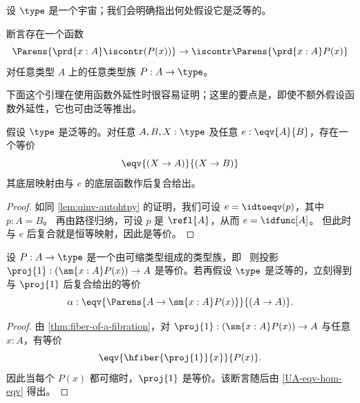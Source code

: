 %
设 $\type$ 是一个宇宙；我们会明确指出何处假设它是泛等的。

\begin{defn}\label{weakfunext}
%
断言存在一个函数
\begin{equation*}
\Parens{\prd{x:A}\iscontr(P(x))} \to\iscontr\Parens{\prd{x:A}P(x)}
\end{equation*}
对任意类型 $A$ 上的任意类型族 $P:A\to\type$。
\end{defn}

下面这个引理在使用函数外延性时很容易证明；这里的要点是，即使不额外假设函数外延性，它也可由泛等推出。

\begin{lem} \label{UA-eqv-hom-eqv}
假设 $\type$ 是泛等的。对任意 $A,B,X:\type$ 及任意 $e:\eqv{A}{B}$，存在一个等价
\begin{equation*}
\eqv{(X\to A)}{(X\to B)}
\end{equation*}
其底层映射由与 $e$ 的底层函数作后复合给出。
\end{lem}

\begin{proof}
  如同 \cref{lem:qinv-autohtpy} 的证明，我们可设 $e = \idtoeqv(p)$，其中 $p:A=B$。
  再由路径归纳，可设 $p$ 是 $\refl{A}$，从而 $e = \idfunc[A]$。
  但此时与 $e$ 后复合就是恒等映射，因此是等价。
\end{proof}

\begin{cor}\label{contrfamtotalpostcompequiv}
设 $P:A\to\type$ 是一个由可缩类型组成的类型族，即\ 
则投影 $\proj{1}:(\sm{x:A}P(x))\to A$ 是等价。若再假设 $\type$ 是泛等的，立刻得到与 $\proj{1}$ 后复合给出的等价
\begin{equation*}
\alpha : \eqv{\Parens{A\to\sm{x:A}P(x)}}{(A\to A)}.
\end{equation*}
\end{cor}

\begin{proof}
  由 \cref{thm:fiber-of-a-fibration}，对 $\proj{1}:(\sm{x:A}P(x))\to A$ 与任意 $x:A$，有等价
  \begin{equation*}
    \eqv{\hfiber{\proj{1}}{x}}{P(x)}.
  \end{equation*}
  因此当每个 $P(x)$ 都可缩时，$\proj{1}$ 是等价。该断言随后由 \cref{UA-eqv-hom-eqv} 得出。
\end{proof}

